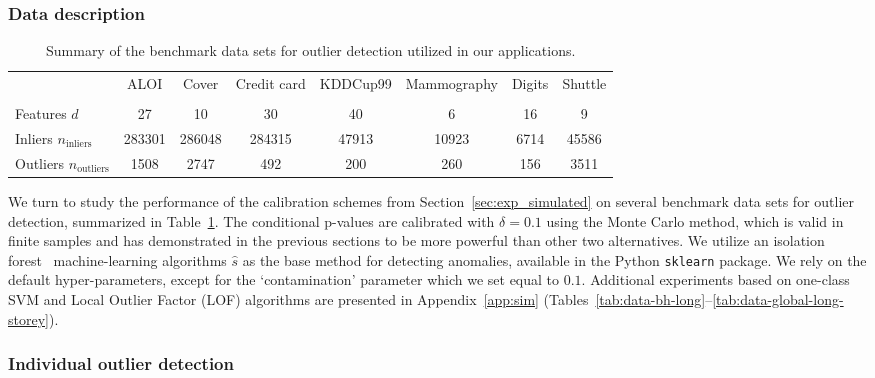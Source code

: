\subsubsection{Data description}

\begin{table}[!htb]
\centering
\small
\caption{\label{tab:datasets}Summary of the benchmark data sets for outlier detection utilized in our applications.}
\begin{tabular}{@{}lccccccc@{}}
\toprule
                  & ALOI  & Cover  & Credit card & KDDCup99 & Mammography & Digits & Shuttle \\
                         & \cite{campos2016evaluation,aloi}   & \cite{cover}    & \cite{creditcard}         & \cite{campos2016evaluation,KDDCup99}      & \cite{mammography}         & \cite{pendigits}    & \cite{shuttle}     \\ \midrule
Features $d$      & 27    & 10     & 30          & 40       & 6           & 16     & 9       \\
Inliers ${n_\text{inliers}}$   & 283301 & 286048 & 284315      & 47913    & 10923       & 6714   & 45586   \\
Outliers ${n_\text{outliers}}$ & 1508  & 2747   & 492         & 200      & 260         & 156    & 3511   \\ \bottomrule
\end{tabular}
\end{table}

We turn to study the performance of the calibration schemes from Section~\ref{sec:exp_simulated} on several benchmark data sets for outlier detection, summarized in Table~\ref{tab:datasets}. The conditional p-values are calibrated with $\delta = 0.1$ using the Monte Carlo method, which is valid in finite samples and has demonstrated in the previous sections to be more powerful than other two alternatives.
We utilize an isolation forest~\cite{liu2008isolation} machine-learning algorithms $\hat{s}$ as the base method for detecting anomalies, available in the Python \texttt{sklearn} package. We rely on the default hyper-parameters, except for the `contamination' parameter which we set equal to $0.1$. Additional experiments based on one-class SVM and Local Outlier Factor (LOF) algorithms are presented in Appendix~\ref{app:sim} (Tables~\ref{tab:data-bh-long}--\ref{tab:data-global-long-storey}).

\subsubsection{Individual outlier detection}\label{sec:real_individual_outlier_detection}

